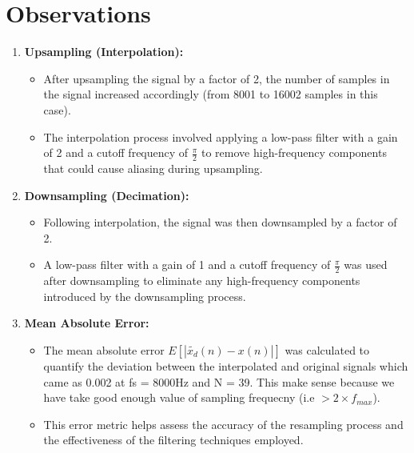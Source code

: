 \documentclass[journal,12pt,onecolumn]{IEEEtran}
\theoremstyle{remark}
\begin{document}
\section{Observations}
\begin{enumerate}
    \item \textbf{Upsampling (Interpolation):}
    \begin{itemize}
        \item After upsampling the signal by a factor of 2, the number of samples in the signal increased accordingly (from 8001 to 16002 samples in this case).
        \item The interpolation process involved applying a low-pass filter with a gain of 2 and a cutoff frequency of \( \frac{\pi}{2} \) to remove high-frequency components that could cause aliasing during upsampling.
    \end{itemize}
    
    \item \textbf{Downsampling (Decimation):}
    \begin{itemize}
        \item Following interpolation, the signal was then downsampled by a factor of 2.
        \item A low-pass filter with a gain of 1 and a cutoff frequency of \( \frac{\pi}{2} \) was used after downsampling to eliminate any high-frequency components introduced by the downsampling process.
    \end{itemize}
    
    \item \textbf{Mean Absolute Error:}
    \begin{itemize}
        \item The mean absolute error \( E[|\widetilde{x_d}(n) - x(n)|] \) was calculated to quantify the deviation between the interpolated and original signals which came as 0.002 at fs = 8000Hz and N = 39. This make sense because we have take good enough value of sampling frequecny (i.e  $> 2\times f_{max}$).
        \item This error metric helps assess the accuracy of the resampling process and the effectiveness of the filtering techniques employed.
    \end{itemize}
\end{enumerate}
\end{document}
